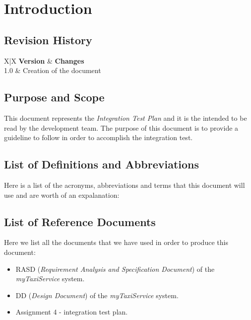 \section{Introduction} %
\label{sec:introduction}

\subsection{Revision History} %
\label{sub:revision_history}
\begin{tabularx}{\textwidth}{ X|X }
	\textbf{Version} & \textbf{Changes} \\ \hline
	 {1.0} & Creation of the document \\
\end{tabularx}

\subsection{Purpose and Scope} %
\label{sub:purpose_and_scope}

This document represents the \emph{Integration Test Plan} and it is the intended to be read by the development team.
The purpose of this document is to provide a guideline to follow in order to accomplish the integration test.


\subsection{List of Definitions and Abbreviations} %
\label{sub:definitions_and_abbreviations}
Here is a list of the acronyms, abbreviations and terms that this document will use and are worth of an expalanation:

\subsection{List of Reference Documents} %
\label{sub:reference_documents}
Here we list all the documents that we have used in order to produce this document:
\begin{itemize}
	\item RASD (\emph{Requirement Analysis and Specification Document}) of the \emph{myTaxiService} system.
	\item DD (\emph{Design Document}) of the \emph{myTaxiService} system.
	\item Assignment 4 - integration test plan.
\end{itemize}
